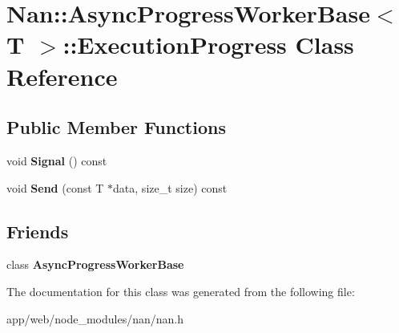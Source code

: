\hypertarget{class_nan_1_1_async_progress_worker_base_1_1_execution_progress}{}\section{Nan\+:\+:Async\+Progress\+Worker\+Base$<$ T $>$\+:\+:Execution\+Progress Class Reference}
\label{class_nan_1_1_async_progress_worker_base_1_1_execution_progress}
\subsection*{Public Member Functions}
\begin{DoxyCompactItemize}
\item 
\mbox{\label{class_nan_1_1_async_progress_worker_base_1_1_execution_progress_ad71c8fa2c4dad8201beb064d4b6384a8}} 
void {\bfseries Signal} () const
\item 
\mbox{\label{class_nan_1_1_async_progress_worker_base_1_1_execution_progress_a5f0ff2b5d0f0e5f873b5541cde225104}} 
void {\bfseries Send} (const T $\ast$data, size\+\_\+t size) const
\end{DoxyCompactItemize}
\subsection*{Friends}
\begin{DoxyCompactItemize}
\item 
\mbox{\label{class_nan_1_1_async_progress_worker_base_1_1_execution_progress_adfe113a435680fb8450e83c466df1871}} 
class {\bfseries Async\+Progress\+Worker\+Base}
\end{DoxyCompactItemize}


The documentation for this class was generated from the following file\+:\begin{DoxyCompactItemize}
\item 
app/web/node\+\_\+modules/nan/nan.\+h\end{DoxyCompactItemize}
